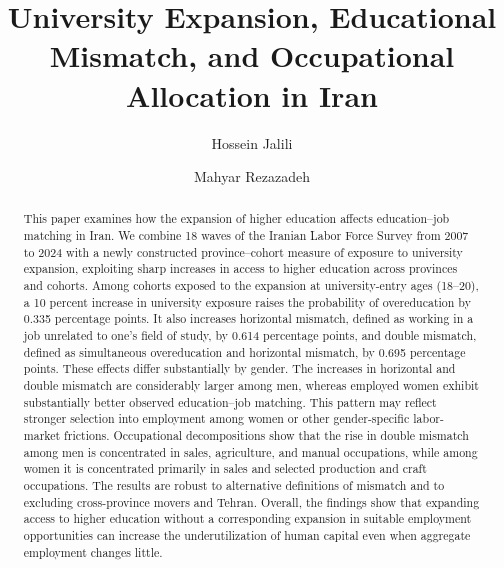 \documentclass[11pt]{article}
\title{University Expansion, Educational Mismatch, and Occupational Allocation in Iran}
\author[1]{Hossein Jalili}
\author[2]{Mahyar Rezazadeh}
\affil[1,2]{Simon Fraser University}
\begin{document}
\maketitle
\begin{abstract}

This paper examines how the expansion of higher education affects education–job matching in Iran. We combine 18 waves of the Iranian Labor Force Survey from 2007 to 2024 with a newly constructed province–cohort measure of exposure to university expansion, exploiting sharp increases in access to higher education across provinces and cohorts. Among cohorts exposed to the expansion at university-entry ages (18–20), a 10 percent increase in university exposure raises the probability of overeducation by 0.335 percentage points. It also increases horizontal mismatch, defined as working in a job unrelated to one’s field of study, by 0.614 percentage points, and double mismatch, defined as simultaneous overeducation and horizontal mismatch, by 0.695 percentage points. These effects differ substantially by gender. The increases in horizontal and double mismatch are considerably larger among men, whereas employed women exhibit substantially better observed education–job matching. This pattern may reflect stronger selection into employment among women or other gender-specific labor-market frictions. Occupational decompositions show that the rise in double mismatch among men is concentrated in sales, agriculture, and manual occupations, while among women it is concentrated primarily in sales and selected production and craft occupations. The results are robust to alternative definitions of mismatch and to excluding cross-province movers and Tehran. Overall, the findings show that expanding access to higher education without a corresponding expansion in suitable employment opportunities can increase the underutilization of human capital even when aggregate employment changes little.




\end{abstract}
\end{document}
